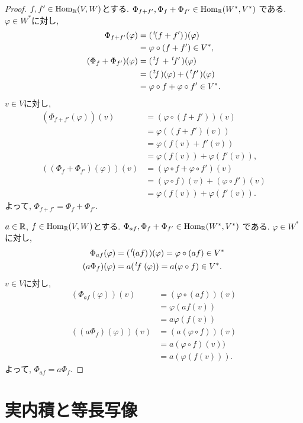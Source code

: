 \begin{proof}
  $f,f'\in \operatorname{Hom}_{\mathbb{R}}(V,W)$とする.
  $\Phi_{f+f'},\Phi_{f}+\Phi_{f'}\in\operatorname{Hom}_{\mathbb{R}}(W^\ast,V^\ast)$
  である.
  $\varphi\in W^\ast$に対し,
  \begin{align*}
    \Phi_{f+f'}(\varphi)
    &=(\left.^{t}\!(f+f')\right.)(\varphi)\\
    &=\varphi\circ(f+f')\in V^\ast,\\
    (\Phi_{f}+\Phi_{f'})(\varphi)
    &=(\left.^{t}\!f\right.+\left.^{t}\!f'\right.)(\varphi)\\
    &=(\left.^{t}\!f\right.)(\varphi)+(\left.^{t}\!f'\right.)(\varphi)\\
    &=\varphi\circ f+\varphi\circ f'\in V^\ast.
  \end{align*}
  $v\in V$に対し,
  \begin{align*}
    (\Phi_{f+f'}(\varphi))(v)
    &=(\varphi\circ(f+f'))(v)\\
    &=\varphi((f+f')(v))\\
    &=\varphi(f(v)+f'(v))\\
    &=\varphi(f(v))+\varphi(f'(v)),\\
    ((\Phi_{f}+\Phi_{f'})(\varphi))(v)
    &=(\varphi\circ f+\varphi\circ f')(v)\\
    &=(\varphi\circ f)(v)+(\varphi\circ f')(v)\\
    &=\varphi(f(v))+\varphi(f'(v)).
  \end{align*}
  よって, $\Phi_{f+f'}=\Phi_{f}+\Phi_{f'}$.
 
  $a\in\mathbb{R}$,
  $f\in \operatorname{Hom}_{\mathbb{R}}(V,W)$とする.
  $\Phi_{af},\Phi_{f}+\Phi_{f'}\in\operatorname{Hom}_{\mathbb{R}}(W^\ast,V^\ast)$
  である.
  $\varphi\in W^\ast$に対し,
  \begin{align*}
    \Phi_{af}(\varphi)&=(\left.^{t}\!(a f)\right.)(\varphi)=\varphi\circ(af)\in V^\ast\\
    (a\Phi_{f})(\varphi)&=a(\left.^{t}\!f\right.(\varphi))=a(\varphi\circ f)\in V^\ast.
  \end{align*}
  $v\in V$に対し,
  \begin{align*}
    (\Phi_{af}(\varphi))(v)
    &=(\varphi\circ(af)) (v)\\
    &=\varphi(af(v))\\
    &=a\varphi(f(v))\\
    ((a\Phi_{f})(\varphi))(v)
    &=(a(\varphi\circ f))(v)\\
    &=a(\varphi\circ f)(v))\\
    &=a(\varphi(f(v))).
  \end{align*}
  よって, $\Phi_{af}=a\Phi_{f}$.
\end{proof}


\section{実内積と等長写像}
